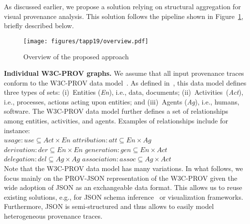 As discussed earlier, we propose a solution relying on structural aggregation for visual provenance analysis. This solution follows the pipeline shown in Figure~\ref{fig:overview}, briefly described below.  


\begin{figure}[b]
\centering
 \texttt{[image: figures/tapp19/overview.pdf]}
 \caption{Overview of the proposed approach}
 \label{fig:overview}
\end{figure}

\smallskip
\noindent \textbf{Individual W3C-PROV graphs.} We assume that all input provenance traces conform to the W3C-PROV data model~\cite{w3c-prov-dm}. 
%
As defined in~\cite{MissierBGCD14}, this data model defines three types of sets: (i)~Entities (\emph{En}), i.e., data, documents; (ii)~Activities~(\emph{Act}), i.e., processes, actions acting upon entities; and (iii)~Agents (\emph{Ag}), i.e., humans, software. The W3C-PROV data model further defines a set of relationships among entities, activities, and agents. Examples of relationships include for instance:\\
$usage:use \subseteq Act \times En$ 
\hspace{1.2cm}
$attribution:att \subseteq En \times Ag$\\
$derivation:der \subseteq En \times En$
\hspace{0.5cm}
$generation:gen \subseteq En \times Act$\\
$delegation:del \subseteq Ag \times Ag$
\hspace{0.5cm}
$association:assoc \subseteq Ag \times Act$\\

\hspace{-1em}Note that the W3C-PROV data model has many variations. In what follows, we focus mainly on the PROV-JSON representation of the W3C-PROV given the wide adoption of JSON as an exchangeable data format. This allows us to reuse existing solutions, e.g., for JSON schema inference~\cite{baazizi2017} or visualization frameworks. %
Furthermore, JSON is semi-structured and thus allows to easily model heterogeneous provenance traces. 




